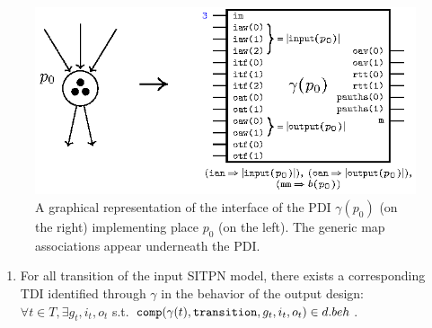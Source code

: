\begin{definition}
  \begin{figure}[h]
    \centering
    \includegraphics[keepaspectratio,width=.7\textwidth]{gen-pci-ex.eps}
    \caption{A graphical representation of the interface of the PDI
      $\gamma(p_0)$ (on the right) implementing place $p_0$ (on the
      left). The generic map associations appear underneath the PDI.}
    \label{fig:gen-pci-ex}
  \end{figure}
  
  \begin{enumerate}[resume]

  \item\label{it:exists-tdi} For all transition of the input SITPN model, there exists a
    corresponding TDI identified through $\gamma$ in the behavior of
    the output design:\\
    $\forall{}t\in{}T,\exists{}g_t,i_t,o_t$ s.t. $\mathtt{comp}(\gamma(t),\mathtt{transition},g_t,i_t,o_t)\in{}d.beh$.
    

\end{enumerate}
\end{definition}
